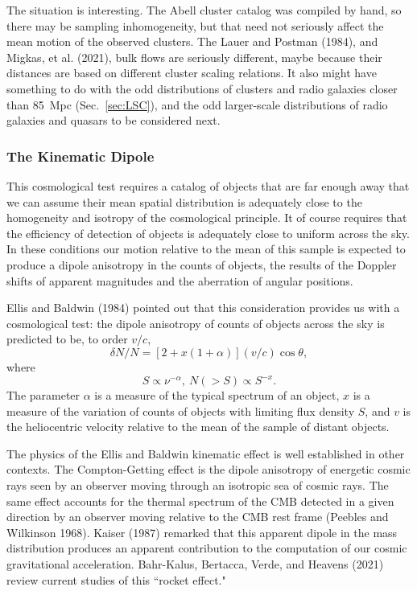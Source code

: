 \documentclass[fleqn,usenatbib]{mnras}
\newcommand{\beq}{\begin{equation}}
\newcommand{\eeq}{\end{equation}}
\begin{document}
The situation is interesting. The Abell cluster catalog was compiled by hand, so there may be sampling inhomogeneity, but that need not seriously affect the mean motion of the observed clusters. The Lauer and Postman (1984), and  Migkas, et al. (2021), bulk flows are seriously different, maybe because their distances are based on different cluster scaling relations. It also might have something to do with the odd distributions of clusters and radio galaxies closer than 85~Mpc (Sec.~\ref{sec:LSC}), and the odd larger-scale distributions of radio galaxies and quasars to be considered next. 

\subsubsection{The Kinematic Dipole}\label{sec:KinematicDipole} 

This cosmological test requires a catalog of objects that are far enough away that we can assume their mean spatial distribution is adequately close to the homogeneity and isotropy of the cosmological principle. It of course requires that the efficiency of detection of objects is adequately close to uniform across the sky. In these conditions our motion relative to the mean of this sample is expected to produce a dipole anisotropy in the counts of objects, the results of the Doppler shifts of apparent magnitudes and the aberration of angular positions. 

Ellis and Baldwin (1984) pointed out that this consideration provides us with a cosmological test: the dipole anisotropy of counts of objects across the sky is predicted to be, to order $v/c$,
\beq
\delta N/N = [2+x(1+\alpha)](v/c)\cos\theta, \label{eq:EllisBaldwin}
\eeq
where
\beq
 S\propto \nu^{-\alpha}, \ N(>S) \propto S^{-x}. \label{eq:EBparameters}
\eeq
The parameter $\alpha$ is a measure of the typical spectrum of an object, $x$ is a measure of the variation of counts of objects with limiting flux density $S$, and $v$ is the heliocentric velocity relative to the mean of the sample of distant objects.

The physics of the Ellis and Baldwin kinematic effect is well established in other contexts. The Compton-Getting effect is the dipole anisotropy of energetic cosmic rays seen by an observer moving through an isotropic sea of cosmic rays. The same effect accounts for the thermal spectrum of the CMB detected in a given direction by an observer moving relative to the CMB rest frame (Peebles and Wilkinson 1968). Kaiser (1987) remarked that this apparent dipole in the mass distribution produces an apparent contribution to the computation of our cosmic gravitational acceleration. Bahr-Kalus, Bertacca, Verde, and Heavens (2021) review current studies of this ``rocket effect." 
\end{document}
